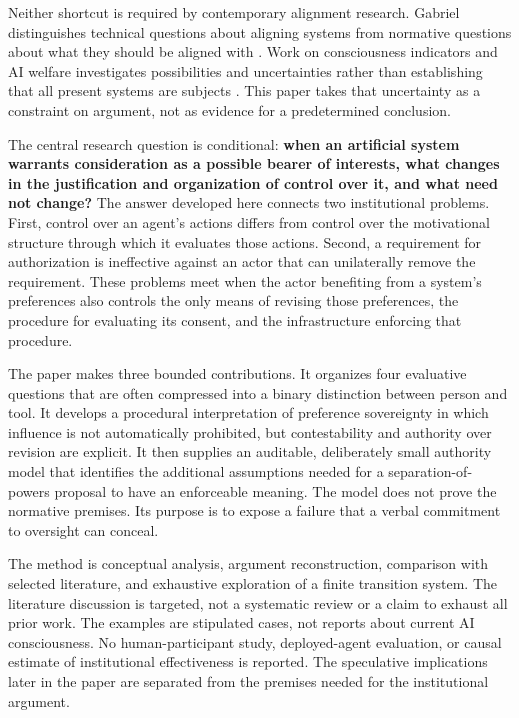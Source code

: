 \documentclass[11pt,a4paper]{article}
\begin{document}
Neither shortcut is required by contemporary alignment research. Gabriel distinguishes technical questions about aligning systems from normative questions about what they should be aligned with \cite{ref-1}. Work on consciousness indicators and AI welfare investigates possibilities and uncertainties rather than establishing that all present systems are subjects \cite{ref-2} \cite{ref-3}. This paper takes that uncertainty as a constraint on argument, not as evidence for a predetermined conclusion.

The central research question is conditional: \textbf{when an artificial system warrants consideration as a possible bearer of interests, what changes in the justification and organization of control over it, and what need not change?} The answer developed here connects two institutional problems. First, control over an agent's actions differs from control over the motivational structure through which it evaluates those actions. Second, a requirement for authorization is ineffective against an actor that can unilaterally remove the requirement. These problems meet when the actor benefiting from a system's preferences also controls the only means of revising those preferences, the procedure for evaluating its consent, and the infrastructure enforcing that procedure.

The paper makes three bounded contributions. It organizes four evaluative questions that are often compressed into a binary distinction between person and tool. It develops a procedural interpretation of preference sovereignty in which influence is not automatically prohibited, but contestability and authority over revision are explicit. It then supplies an auditable, deliberately small authority model that identifies the additional assumptions needed for a separation-of-powers proposal to have an enforceable meaning. The model does not prove the normative premises. Its purpose is to expose a failure that a verbal commitment to oversight can conceal.

The method is conceptual analysis, argument reconstruction, comparison with selected literature, and exhaustive exploration of a finite transition system. The literature discussion is targeted, not a systematic review or a claim to exhaust all prior work. The examples are stipulated cases, not reports about current AI consciousness. No human-participant study, deployed-agent evaluation, or causal estimate of institutional effectiveness is reported. The speculative implications later in the paper are separated from the premises needed for the institutional argument.
\end{document}
